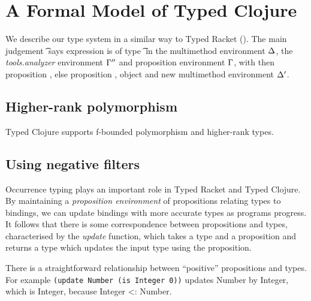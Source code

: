 \documentclass[preprint,10pt]{sigplanconf}
\begin{document}

\section{A Formal Model of Typed Clojure}

We describe our type system in a similar way to Typed Racket (\citet{TF10}).
The main judgement 
{\judgementsevcol {\mmenv}
                 {\taenv}
                 {\propenv}
               {\hastype {\e{}} {\t{}}}
  {\filterset {\thenprop {\prop{}}}
              {\elseprop {\prop{}}}}
  {\object{}}
  {\mmenvp}}
says expression \e{} is of type \t{} in the 
multimethod environment $\Delta$, the \emph{tools.analyzer} environment
$\Gamma''$
and proposition environment $\Gamma$, with 
then proposition {\thenprop {\prop{}}}, else proposition {\elseprop {\prop{}}},
object \object{} and new multimethod environment
${\Delta'}$.


\subsection{Higher-rank polymorphism}

Typed Clojure supports f-bounded polymorphism and higher-rank
types.

\subsection{Using negative filters}

Occurrence typing plays an important role in Typed Racket and Typed Clojure.
By maintaining a \emph{proposition environment} of propositions relating types to
bindings, we can update bindings with more accurate types as programs progress.
It follows that there is some correspondence between propositions and types,
characterised by the \emph{update} function, which takes a type and a proposition
and returns a type which updates the input type using the proposition.

There is a straightforward relationship between ``positive'' propositions and types.
For example 
{\tt (update Number (is Integer 0))}
updates Number by Integer, which is Integer, because Integer <: Number.
\end{document}
